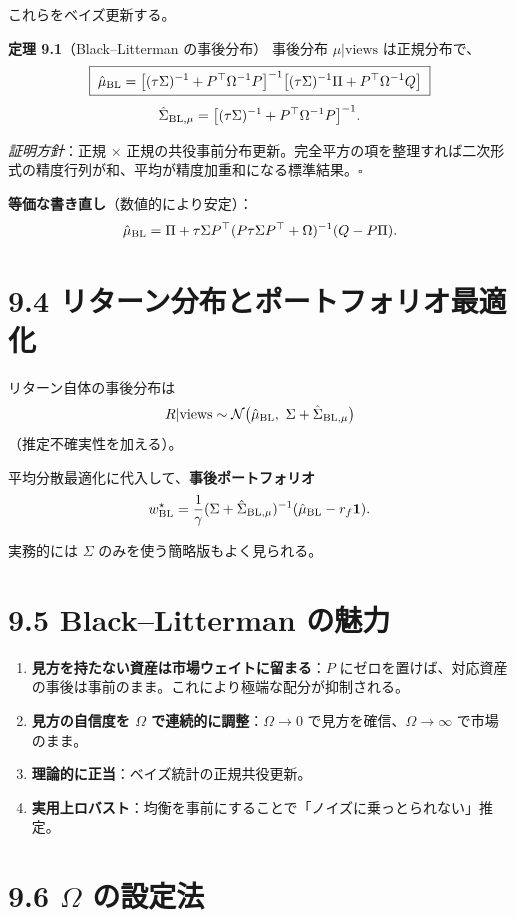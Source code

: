 \documentclass[11pt,a4paper]{report}
\begin{document}
これらをベイズ更新する。

\textbf{定理 9.1}（Black–Litterman の事後分布） 事後分布 $\mu | \text{views}$ は正規分布で、 \[ \boxed{\; \hat\mu_{\rm BL} = \bigl[(\tau\Sigma)^{-1} + P^\top \Omega^{-1} P \bigr]^{-1}\bigl[(\tau\Sigma)^{-1} \Pi + P^\top \Omega^{-1} Q\bigr] \;} \] \[ \hat\Sigma_{\rm BL,\mu} = \bigl[(\tau\Sigma)^{-1} + P^\top \Omega^{-1} P\bigr]^{-1}. \]

\emph{証明方針}：正規 × 正規の共役事前分布更新。完全平方の項を整理すれば二次形式の精度行列が和、平均が精度加重和になる標準結果。$\square$

\textbf{等価な書き直し}（数値的により安定）： \[ \hat\mu_{\rm BL} = \Pi + \tau\Sigma P^\top (P \tau\Sigma P^\top + \Omega)^{-1} (Q - P\Pi). \]

\section{9.4 リターン分布とポートフォリオ最適化}

リターン自体の事後分布は \[ R | \text{views} \sim \mathcal{N}\bigl(\hat\mu_{\rm BL},\ \Sigma + \hat\Sigma_{\rm BL,\mu}\bigr) \] （推定不確実性を加える）。

平均分散最適化に代入して、\textbf{事後ポートフォリオ} \[ w^\star_{\rm BL} = \frac{1}{\gamma}(\Sigma + \hat\Sigma_{\rm BL,\mu})^{-1}(\hat\mu_{\rm BL} - r_f\mathbf{1}). \]

実務的には $\Sigma$ のみを使う簡略版もよく見られる。

\section{9.5 Black–Litterman の魅力}

\begin{enumerate}
\item \textbf{見方を持たない資産は市場ウェイトに留まる}：$P$ にゼロを置けば、対応資産の事後は事前のまま。これにより極端な配分が抑制される。
\item \textbf{見方の自信度を $\Omega$ で連続的に調整}：$\Omega \to 0$ で見方を確信、$\Omega \to \infty$ で市場のまま。
\item \textbf{理論的に正当}：ベイズ統計の正規共役更新。
\item \textbf{実用上ロバスト}：均衡を事前にすることで「ノイズに乗っとられない」推定。
\end{enumerate}

\section{9.6 $\Omega$ の設定法}
\end{document}
